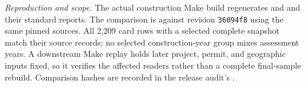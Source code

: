 \small
\textit{Reproduction and scope.} The actual construction Make build regenerates
 and
 and their standard reports.
The comparison is against revision \texttt{36094f8} using the same pinned sources.
All 2,209 card rows with a selected complete snapshot match their source records;
no selected construction-year group mixes assessment years. A downstream Make
replay holds later project, permit, and geographic inputs fixed, so it verifies
the affected readers rather than a complete final-sample rebuild. Comparison
hashes are recorded in the release audit's .
\normalsize
